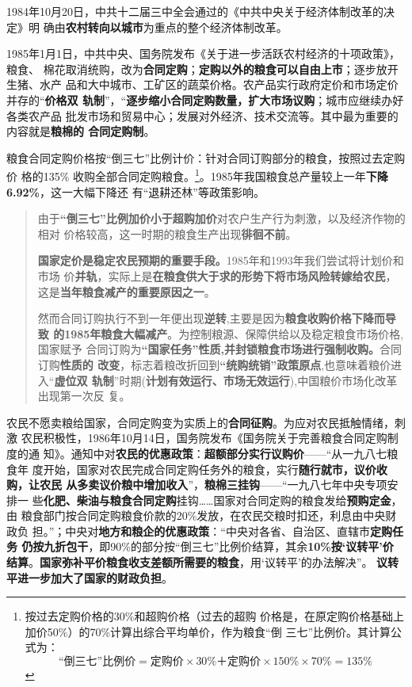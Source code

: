 1984年10月20日，中共十二届三中全会通过的《中共中央关于经济体制改革的决定》明
确由\textbf{农村转向以城市}为重点的整个经济体制改革。

1985年1月1日，中共中央、国务院发布《关于进一步活跃农村经济的十项政策》，粮食、
棉花取消统购，改为\textbf{合同定购}；\textbf{定购以外的粮食可以自由上市}；逐步放开生猪、水产
品和大中城市、工矿区的蔬菜价格。农产品实行政府定价和市场定价并存的“\textbf{价格双
  轨制}”，“\textbf{逐步缩小合同定购数量，扩大市场议购}；城市应继续办好各类农产品
批发市场和贸易中心；发展对外经济、技术交流等。其中最为重要的内容就是\textbf{粮棉的
  合同定购制}。

粮食合同定购价格按“倒三七”比例计价：针对合同订购部分的粮食，按照过去定购价
格的135\% 收购全部合同定购粮食。\footnote{按过去定购价格的30\%和超购价格（过去的超购
  价格是，在原定购价格基础上加价50\%）的70\%计算出综合平均单价，作为粮食“倒
  三七”比例价。其计算公式为：
  \[ “倒三七”比例价 = 定购价 \times 30\% ＋ 定购价 \times 150\% \times 70\% =
    135\%\]}。1985年我国粮食总产量较上一年\textbf{下降6.92\%}，这一大幅下降还
有“退耕还林”等政策影响。

\begin{quotation}
  由于\textbf{“倒三七”比例加价小于超购加价}对农户生产行为刺激，以及经济作物的相对
  价格较高，这一时期的粮食生产出现\textbf{徘徊不前}。\cite{shuangguizhi}

  \textbf{国家定价是稳定农民预期的重要手段。}1985年和1993年我们尝试将计划价和市场
  价\textbf{并轨}，实际上是\textbf{在粮食供大于求的形势下将市场风险转嫁给农民}，
  这是\textbf{当年粮食减产的重要原因之一}。\cite{lumaisg}

  然而合同订购执行不到一年便出现\textbf{逆转},主要是因为\textbf{粮食收购价格下降而导致
    的1985年粮食大幅减产}。为控制粮源、保障供给以及稳定粮食市场价格,国家赋予
  合同订购为\textbf{“国家任务”性质,并封锁粮食市场进行强制收购。}合同订购\textbf{性质的
    改变}，标志着粮改折回到\textbf{“统购统销”政策原点},也意味着粮价进入“\textbf{虚位双
    轨制}”时期(\textbf{计划有效运行、市场无效运行}),中国粮价市场化改革出现第一次反
  复。\cite{liangshi40}
\end{quotation}

农民不愿卖粮给国家，合同定购变为实质上的\textbf{合同征购}。为应对农民抵触情绪，刺激
农民积极性，1986年10月14日，国务院发布《国务院关于完善粮食合同定购制度的通
知》。通知中对\textbf{农民的优惠政策}：\textbf{超额部分实行议购价}——“从一九八七粮食年
度开始，国家对农民完成合同定购任务外的粮食，实行\textbf{随行就市，议价收购，让农民
  从多卖议价粮中增加收入}”，\textbf{粮棉三挂钩}——“一九八七年中央专项安排一
些\textbf{化肥、柴油与粮食合同定购}挂钩……国家对合同定购的粮食发给\textbf{预购定金}，由
粮食部门按合同定购粮食价款的20\%发放，在农民交粮时扣还，利息由中央财政负
担。”；中央对\textbf{地方和粮企的优惠政策}：“中央对各省、自治区、直辖市\textbf{定购任务
  仍按九折包干}，即90\%的部分按“倒三七”比例价结算，其余\textbf{10\%按‘议转平’价
  结算}。\textbf{国家弥补平价粮食收支差额所需要的粮食}，用‘议转平’的办法解决”。
\textbf{议转平进一步加大了国家的财政负担}。


